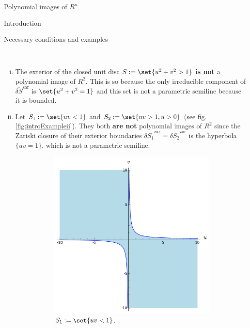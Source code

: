 \documentclass[11pt, a4paper, english, twoside, notitlepage, openright]{report}
\begin{document}
\begin{chapter}{Polynomial images of $R^n$}
\begin{section}{Introduction}
\begin{subsection}{Necessary conditions and examples}
\begin{examples}\label{introExample}
\
\begin{enumerate}[(i)]
\item The exterior of the closed unit disc $S:=\set{u^2+v^2>1}$ \textbf{is not} a polynomial image of $R^2$. This is so because the only irreducible component of $\overline{\delta S}^{\text{zar}}$ is $\set{u^2+v^2=1}$ and this set is not a parametric semiline because it is bounded.
			
\item Let $S_1:=\set{uv<1}$ and $S_2:=\set{uv>1,u>0}$ (see fig. \ref{fig:introExampleii}). They both \textbf{are not} polynomial images of $R^2$ since the Zariski closure of their exterior boundaries $\overline{\delta S_1}^{\text{zar}}=\overline{\delta S_2}^{\text{zar}}$ is the hyperbola $\{uv=1\}$, which is not a parametric semiline.
\begin{figure}[h]\hspace{-0.5cm}
\begin{subfigure}{.55\linewidth}\centering
\includegraphics[width=1\textwidth]{plots/ch1_01_S_1.png}
\caption{$S_1:=\set{uv<1}$.\label{fig:S_1}}
\end{subfigure}
\begin{subfigure}{.55\linewidth}\centering

\end{subfigure}
\end{figure}
\end{enumerate}
\end{examples}
\end{subsection}
\end{section}
\end{chapter}
\end{document}

